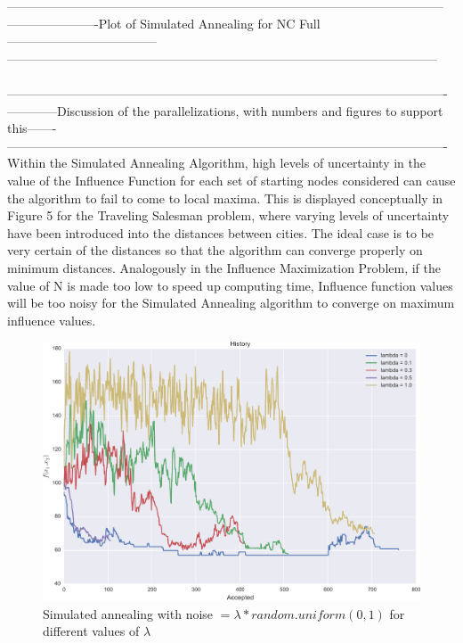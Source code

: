 \documentclass[11pt]{scrartcl} %
\begin{document}
\begin{enumerate}
---------------------------------------------------------------------------------------------------------\\
----------------------Plot of Simulated Annealing for NC Full------------------------------------\\
--------------------------------------------------------------------------------------------------------\\
\\
----------------------------------------------------------------------------------------------------------\\
------------Discussion of the parallelizations, with numbers and figures to support this-------\\
----------------------------------------------------------------------------------------------------------\\

Within the Simulated Annealing Algorithm, high levels of uncertainty in the value of the Influence Function for each set of starting nodes considered can cause the algorithm to fail to come to local maxima.  This is displayed conceptually in Figure 5 for the Traveling Salesman problem, where varying levels of uncertainty have been introduced into the distances between cities.  The ideal case is to be very certain of the distances so that the algorithm can converge properly on minimum distances.  Analogously in the Influence Maximization Problem, if the value of N is made too low to speed up computing time, Influence function values will be too noisy for the Simulated Annealing algorithm to converge on maximum influence values.  \\
\begin{figure}
\centering
\includegraphics[width=10 cm]{lambda01}
\caption{Simulated annealing with noise $= \lambda*random.uniform(0,1)$ for different values of $\lambda$}
\label{fig:SA}
\end{figure}


\end{enumerate}
\end{document}

